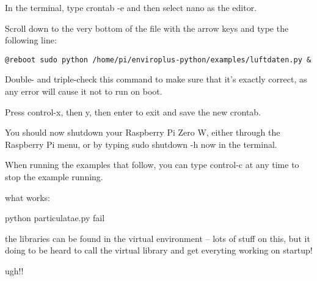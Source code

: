 \documentclass{article}
\begin{document}
In the terminal, type crontab -e and then select nano as the editor.

Scroll down to the very bottom of the file with the arrow keys and type the following line:
\begin{verbatim}
@reboot sudo python /home/pi/enviroplus-python/examples/luftdaten.py &
\end{verbatim}

Double- and triple-check this command to make sure that it's exactly correct, as any error will cause it not to run on boot.

Press control-x, then y, then enter to exit and save the new crontab.

You should now shutdown your Raspberry Pi Zero W, either through the Raspberry Pi menu, or by typing sudo shutdown -h now in the terminal.


When running the examples that follow, you can type control-c at any time to stop the example running.

 what works:

python particulatae.py fail

the libraries can be found in the virtual environment -- lots of stuff on this, but it doing to be heard to call the virtual library and get everyting working on startup!

ugh!!
\end{document}
